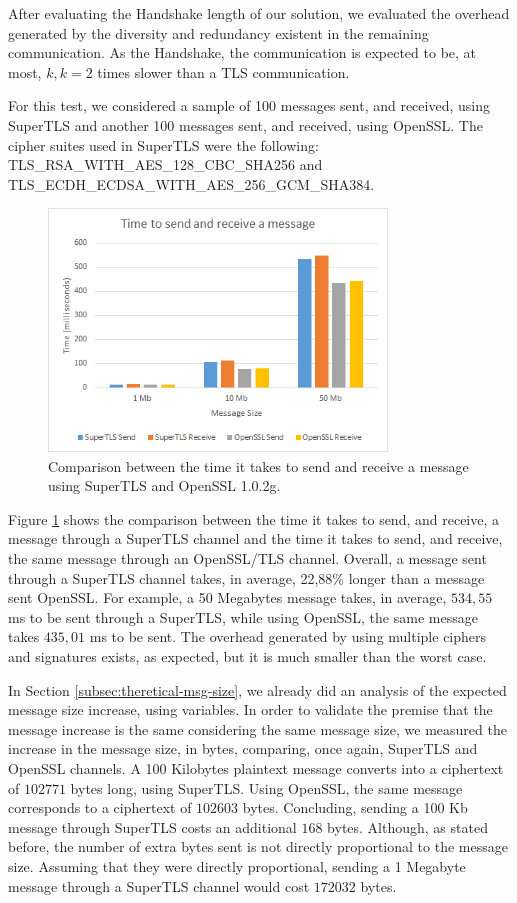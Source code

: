 \documentclass{sig-alternate-05-2015}
\begin{document}
After evaluating the Handshake length of our solution, we evaluated the overhead generated by the diversity and redundancy existent in the remaining communication. As the Handshake, the communication is expected to be, at most, $k, k = 2$ times slower than a TLS communication.

For this test, we considered a sample of 100 messages sent, and received, using SuperTLS and another 100 messages sent, and received, using OpenSSL. The cipher suites used in SuperTLS were the following:\\TLS\_RSA\_WITH\_AES\_128\_CBC\_SHA256 and\\
TLS\_ECDH\_ECDSA\_WITH\_AES\_256\_GCM\_SHA384.

\begin{figure}[t]
\includegraphics[width=9cm]{eval_time_2}
\centering
\caption{Comparison between the time it takes to send and receive a message using SuperTLS and OpenSSL 1.0.2g.}
\label{fig:eval_time_2}
\end{figure}

Figure \ref{fig:eval_time_2} shows the comparison between the time it takes to send, and receive, a message through a SuperTLS channel and the time it takes to send, and receive, the same message through an OpenSSL/TLS channel. Overall, a message sent through a SuperTLS channel takes, in average, 22,88\% longer than a message sent OpenSSL. For example, a 50 Megabytes message takes, in average, $534,55$ ms to be sent through a SuperTLS, while using OpenSSL, the same message takes $435,01$ ms to be sent.
The overhead generated by using multiple ciphers and signatures exists, as expected, but it is much smaller than the worst case.

In Section \ref{subsec:theretical-msg-size}, we already did an analysis of the expected message size increase, using variables. In order to validate the premise that the message increase is the same considering the same message size, we measured the increase in the message size, in bytes, comparing, once again, SuperTLS and OpenSSL channels.
A 100 Kilobytes plaintext message converts into a ciphertext of $102 771$ bytes long, using SuperTLS. Using OpenSSL, the same message corresponds to a ciphertext of $102 603$ bytes. Concluding, sending a 100 Kb message through SuperTLS costs an additional $168$ bytes. Although, as stated before, the number of extra bytes sent is not directly proportional to the message size. Assuming that they were directly proportional, sending a 1 Megabyte message through a SuperTLS channel would cost $172 032$ bytes.
\end{document}
